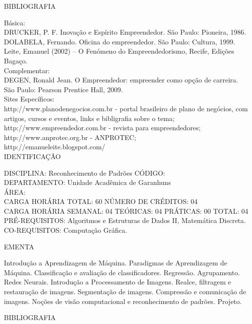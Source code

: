 \documentclass[
	12pt,				%
	openright,			%
  oneside,     %
	a4paper,			%
	english,			%
	french,				%
	spanish,			%
	brazil				%
	]{abntex2}
\begin{document}
\begin{apendicesenv}
BIBLIOGRAFIA 

Básica:\\
DRUCKER, P. F. Inovação e Espírito Empreendedor. São Paulo: Pioneira,
1986.\\
DOLABELA, Fernando. Oficina do empreendedor. São Paulo: Cultura, 1999.\\
Leite, Emanuel (2002) -- O Fenómeno do Empreendedorismo, Recife, Edições
Bagaço.\\
Complementar:\\
DEGEN, Ronald Jean. O Empreendedor: empreender como opção de carreira. São Paulo: Pearson Prentice Hall, 2009.\\
Sites Específicos:\\
http://www.planodenegocios.com.br - portal brasileiro de plano de negócios, com artigos, cursos e eventos, links e bibligrafia sobre o tema;\\
http://www.empreendedor.com.br - revista para empreendedores;\\
http://www.anprotec.org.br - ANPROTEC;\\
http://emanueleite.blogspot.com/\\


\newpage IDENTIFICAÇÃO

DISCIPLINA: Reconhecimento de Padrões CÓDIGO:\\ 
DEPARTAMENTO: Unidade Acadêmica de Garanhuns\\
ÁREA: \\
CARGA HORÁRIA TOTAL: 60 NÚMERO DE CRÉDITOS: 04\\
CARGA HORÁRIA SEMANAL: 04 TEÓRICAS: 04 PRÁTICAS: 00 TOTAL: 04\\
PRÉ-REQUISITOS: Algoritmos e Estruturas de Dados II, Matemática
Discreta.\\
CO-REQUISITOS: Computação Gráfica.

EMENTA 

Introdução a Aprendizagem de Máquina. Paradigmas de Aprendizagem de
Máquina. Classificação e avaliação de classificadores. Regressão.
Agrupamento. Redes Neurais. Introdução a Processamento de Imagens.
Realce, filtragem e restauração de imagens. Segmentação de imagens.
Compressão e comunicação de imagens. Noções de visão computacional e
reconhecimento de padrões. Projeto.

BIBLIOGRAFIA 


\end{apendicesenv}
\end{document}
